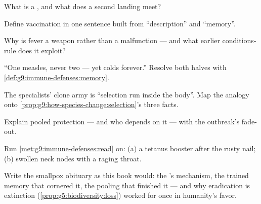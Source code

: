\begin{exercise}[$\star$]\label{exo:g9:immune-defenses:5}
What is a , and what does a second landing
meet?
\end{exercise}

\begin{exercise}[$\star$]\label{exo:g9:immune-defenses:6}
Define vaccination in one sentence built from
``description'' and ``memory''.
\end{exercise}

\begin{exercise}[$\star\star$]\label{exo:g9:immune-defenses:7}
Why is fever a weapon rather than a malfunction --- and
what earlier conditions-rule does it exploit?
\end{exercise}

\begin{exercise}[$\star\star$]\label{exo:g9:immune-defenses:8}
``One measles, never two --- yet colds forever.''
Resolve both halves with
\cref{def:g9:immune-defenses:memory}.
\end{exercise}

\begin{exercise}[$\star\star$]\label{exo:g9:immune-defenses:9}
The specialists' clone army is ``selection run inside
the body''. Map the analogy onto
\cref{prop:g9:how-species-change:selection}'s three
facts.
\end{exercise}

\begin{exercise}[$\star\star$]\label{exo:g9:immune-defenses:10}
Explain pooled protection --- and who depends on it ---
with the outbreak's fade-out.
\end{exercise}

\begin{exercise}[$\star\star$]\label{exo:g9:immune-defenses:11}
Run \cref{met:g9:immune-defenses:read} on: (a) a
tetanus booster after the rusty nail; (b) swollen neck
nodes with a raging throat.
\end{exercise}

\begin{exercise}[$\star\star\star$]\label{exo:g9:immune-defenses:12}
Write the smallpox obituary as this book would: the
's mechanism, the trained memory that cornered it,
the pooling that finished it --- and why eradication is
extinction (\cref{prop:g5:biodiversity:loss}) worked for
once in humanity's favor.
\end{exercise}

